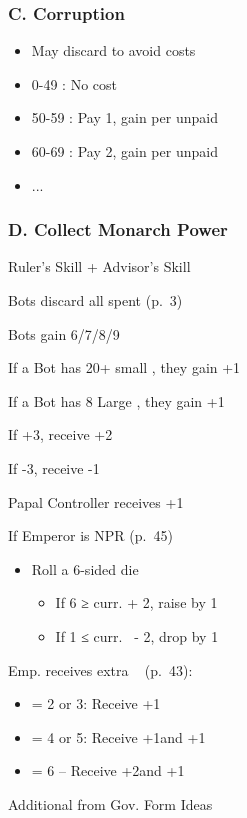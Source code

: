 \documentclass[10pt]{article}
\begin{document}
\subsubsection*{C. Corruption}
\begin{itemize}
	\item May discard \ducats to avoid costs
	\item 0-49 \ducats: No cost
	\item 50-59 \ducats: Pay 1\adminpower, gain \interest per unpaid \adminpower
	\item 60-69 \ducats: Pay 2\adminpower, gain \interest per unpaid \adminpower
	\item ...
\end{itemize}

\subsubsection*{D. Collect Monarch Power}
\begin{itemize}
	\item Ruler's Skill + Advisor's Skill
	{\botrules
	\item Bots discard all spent \botpower (p.~3)
	\item Bots gain 6/7/8/9 \botpower
	\item If a Bot has 20+ small \towns, they gain +1\botpower
	\item If a Bot has 8 Large \towns, they gain +1\botpower
	}
	\item If +3\stability, receive +2\monarchpower
	\item If -3\stability, receive -1\monarchpower
	\item Papal Controller receives +1\diplopower~
	\item If Emperor is NPR (p.~45) 
	\begin{itemize}
		\item Roll a 6-sided die
		\begin{itemize}
			\item If 6  ≥ curr. \authority + 2, raise \authority by 1
			\item If 1  ≤ curr. \authority~- 2, drop \authority by 1
		\end{itemize}
	\end{itemize}
	\item Emp. receives extra \monarchpower~ (p.~43):
	\begin{itemize}
		\item \authority = 2 or 3: Receive +1\diplopower
		\item \authority = 4 or 5: Receive +1\diplopower and +1\milpower
		\item \authority = 6 – Receive +2\diplopower and +1\milpower
	\end{itemize}
  \item Additional \monarchpower from Gov. Form Ideas
\end{itemize}
\end{document}
